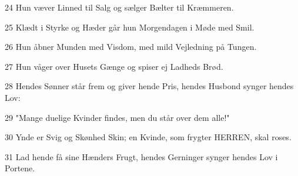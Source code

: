 \par 24 Hun væver Linned til Salg og sælger Bælter til Kræmmeren.
\par 25 Klædt i Styrke og Hæder går hun Morgendagen i Møde med Smil.
\par 26 Hun åbner Munden med Visdom, med mild Vejledning på Tungen.
\par 27 Hun våger over Husets Gænge og spiser ej Ladheds Brød.
\par 28 Hendes Sønner står frem og giver hende Pris, hendes Husbond synger hendes Lov:
\par 29 "Mange duelige Kvinder findes, men du står over dem alle!"
\par 30 Ynde er Svig og Skønhed Skin; en Kvinde, som frygter HERREN, skal roses.
\par 31 Lad hende få sine Hænders Frugt, hendes Gerninger synger hendes Lov i Portene.


